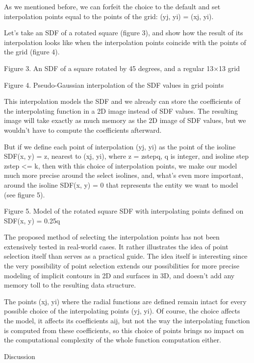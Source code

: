 \documentclass[12pt,a4paper]{article}
\begin{document}
\par
As we mentioned before, we can forfeit the choice to the default and set interpolation points equal to the points of the grid: (yj, yi) = (xj, yi).
\par
Let’s take an SDF of a rotated square (figure 3), and show how the result of its interpolation looks like when the interpolation points coincide with the points of the grid (figure 4).
\par
Figure 3. An SDF of a square rotated by 45 degrees, and a regular 13×13 grid
\par
Figure 4. Pseudo-Gaussian interpolation of the SDF values in grid points
\par
This interpolation models the SDF and we already can store the coefficients of the interpolating function in a 2D image instead of SDF values. The resulting image will take exactly as much memory as the 2D image of SDF values, but we wouldn’t have to compute the coefficients afterward.
\par
But if we define each point of interpolation (yj, yi) as the point of the isoline SDF(x, y) = z, nearest to (xj, yi), where z = zstepq, q is integer, and isoline step zstep <= k, then with this choice of interpolation points, we make our model much more precise around the select isolines, and, what’s even more important, around the isoline SDF(x, y) = 0 that represents the entity we want to model (see figure 5).
\par
Figure 5. Model of the rotated square SDF with interpolating points defined on SDF(x, y) = 0.25q
\par
The proposed method of selecting the interpolation points has not been extensively tested in real-world cases. It rather illustrates the idea of point selection itself than serves as a practical guide. The idea itself is interesting since the very possibility of point selection extends our possibilities for more precise modeling of implicit contours in 2D and surfaces in 3D, and doesn’t add any memory toll to the resulting data structure.
\par
The points (xj, yi) where the radial functions are defined remain intact for every possible choice of the interpolating points (yj, yi). Of course, the choice affects the model, it affects its coefficients aij, but not the way the interpolating function is computed from these coefficients, so this choice of points brings no impact on the computational complexity of the whole function computation either.
\par
Discussion
\par
\end{document}

